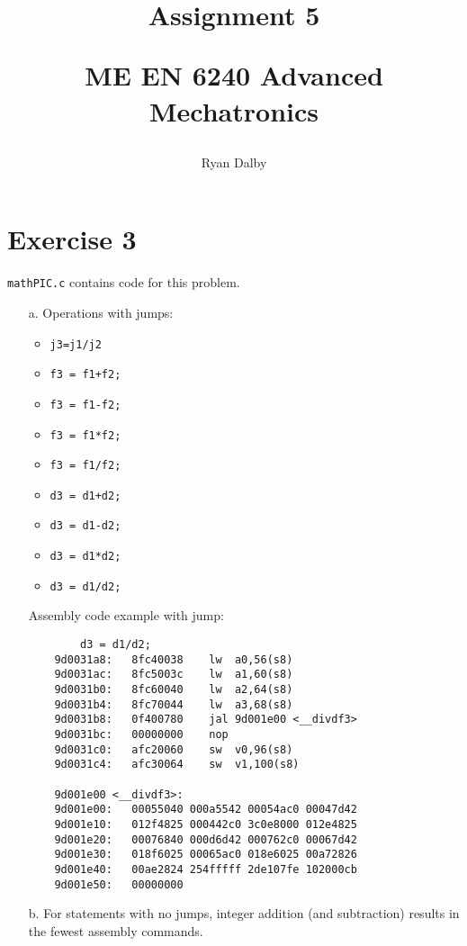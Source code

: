 \documentclass[12pt]{article}
\title{
    Assignment 5 

    \large{
        ME EN 6240 Advanced Mechatronics
    }  
}
\author{
        Ryan Dalby
}
\date{\displaydate{date}}
\begin{document}
\maketitle

\section*{Exercise 3}
\verb|mathPIC.c| contains code for this problem.

\begin{itemize}
    \item[a.]
    Operations with jumps:
    \begin{itemize}
        \item
        \verb|j3=j1/j2|
        \item
        \verb|f3 = f1+f2;|
        \item
        \verb|f3 = f1-f2;|
        \item
        \verb|f3 = f1*f2;|
        \item
        \verb|f3 = f1/f2;|
        \item
        \verb|d3 = d1+d2;|
        \item
        \verb|d3 = d1-d2;|
        \item
        \verb|d3 = d1*d2;|
        \item
        \verb|d3 = d1/d2;|
    \end{itemize}

    Assembly code example with jump:
    \begin{verbatim}
        d3 = d1/d2;
    9d0031a8:	8fc40038 	lw	a0,56(s8)
    9d0031ac:	8fc5003c 	lw	a1,60(s8)
    9d0031b0:	8fc60040 	lw	a2,64(s8)
    9d0031b4:	8fc70044 	lw	a3,68(s8)
    9d0031b8:	0f400780 	jal	9d001e00 <__divdf3>
    9d0031bc:	00000000 	nop
    9d0031c0:	afc20060 	sw	v0,96(s8)
    9d0031c4:	afc30064 	sw	v1,100(s8)

    9d001e00 <__divdf3>:
    9d001e00:	00055040 000a5542 00054ac0 00047d42   
    9d001e10:	012f4825 000442c0 3c0e8000 012e4825   
    9d001e20:	00076840 000d6d42 000762c0 00067d42  
    9d001e30:	018f6025 00065ac0 018e6025 00a72826 
    9d001e40:	00ae2824 254fffff 2de107fe 102000cb
    9d001e50:	00000000                          
    \end{verbatim}

    \item[b.]
    For statements with no jumps, integer addition (and subtraction) results in the fewest assembly commands.


\end{itemize}
\end{document}
